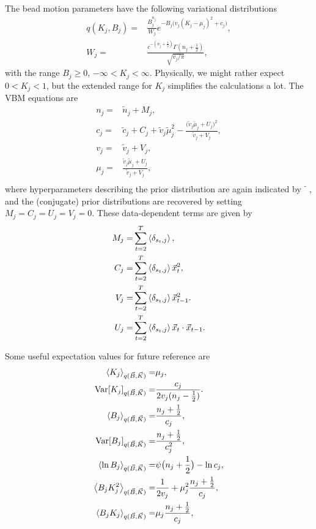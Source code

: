 The bead motion parameters have the following variational distributions
\begin{align}\label{seq:KBtrial}
  q(K_j,B_j)=&\frac{B_j^{n_j}}{W_j}e^{-B_j\big(v_j(K_j-\mu_j)^2+c_j\big)},\\
  W_j=&\frac{c^{-(n_j+\frac 12)}\Gamma(n_j+\frac 12)}{\sqrt{v_j/\pi}},
\end{align}
with the range $B_j\ge 0$, $-\infty<K_j<\infty$. Physically, we might
rather expect $0<K_j<1$, but the extended range for $K_j$ simplifies
the calculations a lot. The VBM equations are
\begin{align}
  n_j=& \tilde n_j+M_j,\label{seq:nj}\\
  c_j=& \tilde c_j+C_j+\tilde v_j\tilde\mu_j^2
  -\frac{\big(\tilde v_j\tilde\mu_j+U_j\big)^2}{\tilde v_j+V_j},\label{seq:cj}\\
  v_j=&\tilde v_j+V_j,\label{seq:vj}\\
  \mu_j=&\frac{\tilde v_j\tilde\mu_j+U_j}{\tilde v_j+V_j},\label{seq:muj}\\
\end{align}
where hyperparameters describing the prior distribution are again
indicated by $\tilde{\phantom{n}}$, and the (conjugate) prior
distributions are recovered by setting $M_j=C_j=U_j=V_j=0$. These
data-dependent terms are given by
\begin{align}
  M_j=&\sum_{t=2}^T\left\langle \delta_{s_t,j}\right\rangle,\label{seq:Mj}\\
  C_j=&\sum_{t=2}^T\left\langle \delta_{s_t,j}\right\rangle\vec{x}_t^2,\label{seq:Cj}\\
  V_j=&\sum_{t=2}^T\left\langle \delta_{s_t,j}\right\rangle\vec{x}_{t-1}^2.\label{seq:Vj}\\
  U_j=&\sum_{t=2}^T\left\langle \delta_{s_t,j}\right\rangle\vec{x}_t\cdot\vec{x}_{t-1}.\label{seq:Uj}
\end{align}

Some useful expectation values for future reference are
\begin{align}
  \left\langle K_j\right\rangle_{q(\vec{B},\vec{K})}=&\mu_j,  \label{seq:meanK}\\
  \text{Var}[K_j]_{q(\vec{B},\vec{K})}=&\frac{c_j}{2v_j(n_j-\frac 12)}.
  \label{seq:varK}\\
  \left\langle B_j\right\rangle_{q(\vec{B},\vec{K})}=&\frac{n_j+\frac 12}{c_j},  \label{seq:meanB}\\
  \text{Var}[B_j]_{q(\vec{B},\vec{K})}=&\frac{n_j+\frac 12}{c_j^2},  
  \label{seq:varB}\\
  \left\langle \ln B_j\right\rangle_{q(\vec{B},\vec{K})}=&\psi\big(n_j+\frac 12\big)-\ln c_j,
  \label{seq:meanlogB}\\
  \left\langle B_jK_j^2\right\rangle_{q(\vec{B},\vec{K})}=&\frac{1}{2v_j}
  +\mu_j^2\frac{n_j+\frac 12}{c_j},  \label{seq:meanBK2}\\
  \left\langle B_jK_j\right\rangle_{q(\vec{B},\vec{K})}=&\mu_j\frac{n_j+\frac 12}{c_j},
  \label{seq:meanBK}
\end{align}

